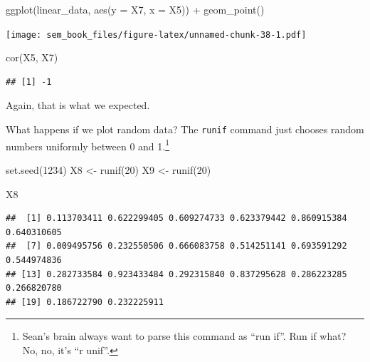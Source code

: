 \documentclass[
]{book}
\newenvironment{Shaded}{\begin{snugshade}}{\end{snugshade}}
\newcommand{\AttributeTok}[1]{\textcolor[rgb]{0.77,0.63,0.00}{#1}}
\newcommand{\DecValTok}[1]{\textcolor[rgb]{0.00,0.00,0.81}{#1}}
\newcommand{\FunctionTok}[1]{\textcolor[rgb]{0.00,0.00,0.00}{#1}}
\newcommand{\NormalTok}[1]{#1}
\newcommand{\OtherTok}[1]{\textcolor[rgb]{0.56,0.35,0.01}{#1}}
\newcommand{\SpecialCharTok}[1]{\textcolor[rgb]{0.00,0.00,0.00}{#1}}
\begin{document}
\begin{Shaded}
\begin{Highlighting}[]
\FunctionTok{ggplot}\NormalTok{(linear\_data, }\FunctionTok{aes}\NormalTok{(}\AttributeTok{y =}\NormalTok{ X7, }\AttributeTok{x =}\NormalTok{ X5)) }\SpecialCharTok{+}
    \FunctionTok{geom\_point}\NormalTok{()}
\end{Highlighting}
\end{Shaded}

\texttt{[image: sem\_book\_files/figure-latex/unnamed-chunk-38-1.pdf]}

\begin{Shaded}
\begin{Highlighting}[]
\FunctionTok{cor}\NormalTok{(X5, X7)}
\end{Highlighting}
\end{Shaded}

\begin{verbatim}
## [1] -1
\end{verbatim}

Again, that is what we expected.

What happens if we plot random data? The \texttt{runif} command just chooses random numbers uniformly between 0 and 1.\footnote{Sean's brain always want to parse this command as ``run if''. Run if what? No, no, it's ``r unif''.}

\begin{Shaded}
\begin{Highlighting}[]
\FunctionTok{set.seed}\NormalTok{(}\DecValTok{1234}\NormalTok{)}
\NormalTok{X8 }\OtherTok{\textless{}{-}} \FunctionTok{runif}\NormalTok{(}\DecValTok{20}\NormalTok{)}
\NormalTok{X9 }\OtherTok{\textless{}{-}} \FunctionTok{runif}\NormalTok{(}\DecValTok{20}\NormalTok{)}
\end{Highlighting}
\end{Shaded}

\begin{Shaded}
\begin{Highlighting}[]
\NormalTok{X8}
\end{Highlighting}
\end{Shaded}

\begin{verbatim}
##  [1] 0.113703411 0.622299405 0.609274733 0.623379442 0.860915384 0.640310605
##  [7] 0.009495756 0.232550506 0.666083758 0.514251141 0.693591292 0.544974836
## [13] 0.282733584 0.923433484 0.292315840 0.837295628 0.286223285 0.266820780
## [19] 0.186722790 0.232225911
\end{verbatim}
\end{document}
